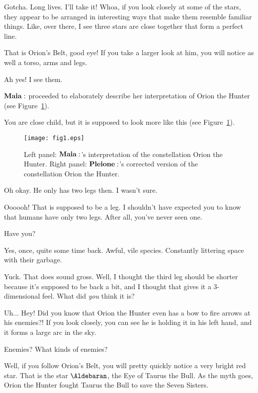 \Maia Gotcha.  Long lives.  I'll take it!  Whoa, if you look closely at some of the stars, they appear to be arranged in interesting ways that make them resemble familiar things.  Like, over there, I see three stars are close together that form a perfect line.

\Pleione That is Orion's Belt, good eye!  If you take a larger look at him, you will notice as well a torso, arms and legs.  

\Maia Ah yes!  I see them.  

$\Maia$ proceeded to elaborately describe her interpretation of Orion the Hunter (see Figure~\ref{fig:fig1}).

\Pleione You are close child, but it is supposed to look more like this (see Figure~\ref{fig:fig1}).

\begin{figure}
\begin{center}
\texttt{[image: fig1.eps]}
\end{center}
\caption[Schematic depictions of Orion the Hunter]{Left panel:  $\Maia$'s interpretation of the constellation Orion the Hunter.  Right panel:  $\Pleione$'s corrected version of the constellation Orion the Hunter.
\label{fig:fig1}}
\end{figure}

\Maia Oh okay.  He only has two legs then.  I wasn't sure.

\Pleione Oooooh!  That is supposed to be a leg.  I shouldn't have expected you to know that humans have only two legs.  After all, you've never seen one.

\Maia Have you?

\Pleione Yes, once, quite some time back.  Awful, vile species.  Constantly littering space with their garbage.

\Maia Yuck.  That does sound gross.  Well, I thought the third leg should be shorter because it's supposed to be back a bit, and I thought that gives it a 3-dimensional feel.  What did \textit{you} think it is?

\Pleione Uh... Hey! Did you know that Orion the Hunter even has a bow to fire arrows at his enemies?!  If you look closely, you can see he is holding it in his left hand, and it forms a large arc in the sky.

\Maia Enemies?  What kinds of enemies?

\Pleione Well, if you follow Orion's Belt, you will pretty quickly notice a very bright red star.  That is the star $\Aldebaran$, the Eye of Taurus the Bull.  As the myth goes, Orion the Hunter fought Taurus the Bull to save the Seven Sisters.  

